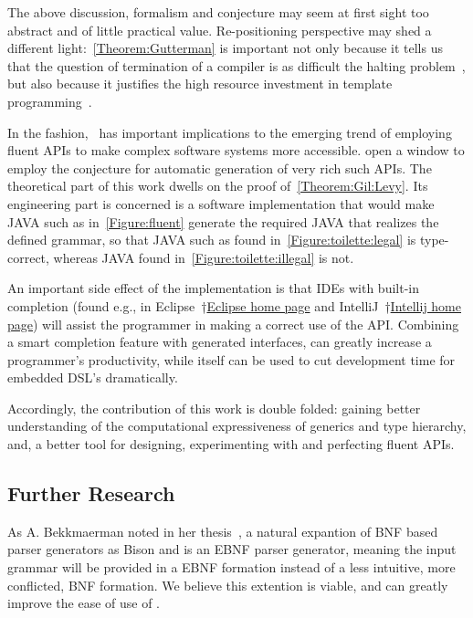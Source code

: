 The above discussion, formalism and conjecture may seem at first sight too abstract
  and of little practical value.
Re-positioning perspective may shed a different light:~\cref{Theorem:Gutterman} is important not only because it tells us
  that the question of termination of a \CC compiler is as difficult
  the halting problem~\cite{Turing:1936}, but also because it
  justifies the high resource investment in
  template programming~\cite{Musser:Stepanov:1989,Dehnert:Stepanov:2000
  ,Backhouse:Jansson:1999, Austern:1998,Bracha:Odersky:1998,Garcia:Jarvi:2003}.

In the fashion,~ has important
  implications to the emerging trend of employing fluent APIs
  to make complex software systems more accessible.
\Self open a window to employ the conjecture for
  automatic generation of very rich such APIs.
The theoretical part of this work dwells on the proof of~\cref{Theorem:Gil:Levy}.
Its engineering part is concerned is
  a software implementation that would make JAVA
  such as in~\cref{Figure:fluent} generate
  the required \Java JAVA that realizes the
  defined grammar, so that JAVA such as
  found in~\cref{Figure:toilette:legal} is type-correct,
  whereas JAVA found in~\cref{Figure:toilette:illegal} is not.	

An important side effect of the implementation is that IDEs with built-in \Java completion
  (found e.g., in Eclipse~†{\href{http://www.eclipse.org/}{Eclipse home page}} and IntelliJ~†{\href{https://www.jetbrains.com/idea/}{Intellij home page}})
  will assist the programmer in making a correct use of the API.
Combining a smart \Java completion feature with \Self generated interfaces,
  can greatly increase a programmer's productivity, while \Self itself can be used
  to cut development time for embedded DSL's dramatically.


Accordingly, the contribution of this work is double folded:
  gaining better understanding of the computational expressiveness of
  \Java generics and type hierarchy, and, a better tool
  for designing, experimenting with and perfecting fluent APIs.

\subsection{Further Research}
As A. Bekkmaerman noted in her thesis~\cite{Bekkerman:04}, a natural expantion of
  BNF based parser generators as Bison and \Self is an EBNF parser generator,
  meaning the input grammar will be provided in a EBNF formation instead of a
  less intuitive, more conflicted, BNF formation.
We believe this extention is viable, and can greatly improve the ease of
  use of \Self.
